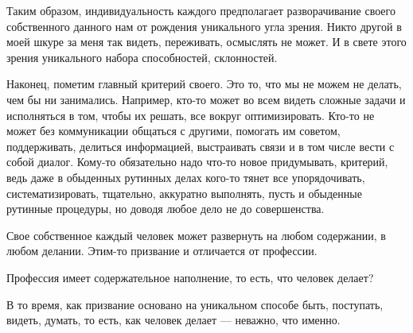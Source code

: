 Таким образом, индивидуальность каждого предполагает разворачивание своего
собственного данного нам от рождения уникального угла зрения. Никто другой в моей
шкуре за меня так видеть, переживать, осмыслять не может. И в свете этого зрения
уникального набора способностей, склонностей. 

Наконец, пометим главный
критерий своего. Это то, что мы не можем не делать, чем бы ни занимались.
Например, кто-то может во всем видеть сложные задачи и исполняться в том, чтобы
их решать, все вокруг оптимизировать. Кто-то не может без коммуникации общаться
с другими, помогать им советом, поддерживать, делиться информацией, выстраивать
связи и в том числе вести с собой диалог. Кому-то обязательно надо что-то новое
придумывать, критерий, ведь даже в обыденных рутинных делах кого-то тянет все
упорядочивать, систематизировать, тщательно, аккуратно выполнять, пусть и
обыденные рутинные процедуры, но доводя любое дело не до совершенства. 

Свое собственное каждый человек может развернуть на
любом содержании, в любом делании. Этим-то призвание и отличается от профессии.

Профессия имеет содержательное наполнение, то есть, что человек делает? 

В то время, как призвание
основано на уникальном способе быть, поступать, видеть, думать, то есть, как
человек делает --- неважно, что именно. 

